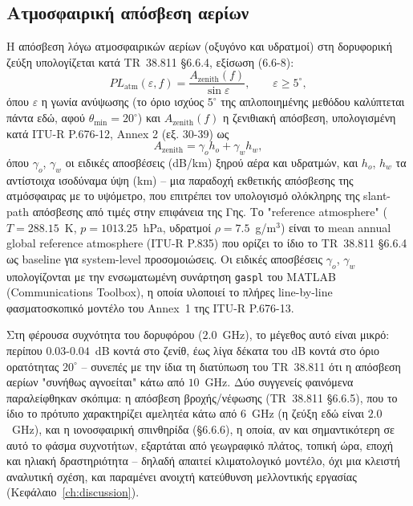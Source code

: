 \subsection{Ατμοσφαιρική απόσβεση αερίων}
\label{subsec:meth-gas-attenuation}

Η απόσβεση λόγω ατμοσφαιρικών αερίων (οξυγόνο και υδρατμοί) στη
δορυφορική ζεύξη υπολογίζεται κατά TR~38.811 §6.6.4, εξίσωση (6.6-8):
\begin{equation}
PL_{\text{atm}}(\varepsilon, f) = \frac{A_{\text{zenith}}(f)}{\sin\varepsilon},
\qquad \varepsilon \ge 5^\circ,
\label{eq:gas-atten}
\end{equation}
όπου $\varepsilon$ η γωνία ανύψωσης (το όριο ισχύος $5^\circ$ της
απλοποιημένης μεθόδου καλύπτεται πάντα εδώ, αφού $\theta_{\min} =
20^\circ$) και $A_{\text{zenith}}(f)$ η ζενιθιακή απόσβεση, υπολογισμένη
κατά ITU-R P.676-12, Annex 2 (εξ. 30-39) ως
\begin{equation}
A_{\text{zenith}} = \gamma_o h_o + \gamma_w h_w,
\label{eq:zenith-atten}
\end{equation}
όπου $\gamma_o$, $\gamma_w$ οι ειδικές αποσβέσεις (dB/km) ξηρού αέρα και
υδρατμών, και $h_o$, $h_w$ τα αντίστοιχα ισοδύναμα ύψη (km) -- μια
παραδοχή εκθετικής απόσβεσης της ατμόσφαιρας με το υψόμετρο, που
επιτρέπει τον υπολογισμό ολόκληρης της slant-path απόσβεσης από τιμές
στην επιφάνεια της Γης. Το "reference atmosphere" ($T = 288.15$~K, $p =
1013.25$~hPa, υδρατμοί $\rho = 7.5$~g/m$^3$) είναι το mean annual global
reference atmosphere (ITU-R P.835) που ορίζει το ίδιο το TR~38.811 §6.6.4
ως baseline για system-level προσομοιώσεις. Οι ειδικές αποσβέσεις
$\gamma_o$, $\gamma_w$ υπολογίζονται με την ενσωματωμένη συνάρτηση
\texttt{gaspl} του MATLAB (Communications Toolbox), η οποία υλοποιεί το
πλήρες line-by-line φασματοσκοπικό μοντέλο του Annex~1 της ITU-R
P.676-13.

Στη φέρουσα συχνότητα του δορυφόρου ($2.0$~GHz), το μέγεθος αυτό είναι
μικρό: περίπου $0.03$-$0.04$~dB κοντά στο ζενίθ, έως λίγα δέκατα του dB
κοντά στο όριο ορατότητας $20^\circ$ -- συνεπές με την ίδια τη διατύπωση
του TR~38.811 ότι η απόσβεση αερίων "συνήθως αγνοείται" κάτω από
$10$~GHz. Δύο συγγενείς φαινόμενα παραλείφθηκαν σκόπιμα: η απόσβεση
βροχής/νέφωσης (TR~38.811 §6.6.5), που το ίδιο το πρότυπο χαρακτηρίζει
αμελητέα κάτω από $6$~GHz (η ζεύξη εδώ είναι $2.0$~GHz), και η
ιονοσφαιρική σπινθηρίδα (§6.6.6), η οποία, αν και σημαντικότερη σε αυτό
το φάσμα συχνοτήτων, εξαρτάται από γεωγραφικό πλάτος, τοπική ώρα, εποχή
και ηλιακή δραστηριότητα -- δηλαδή απαιτεί κλιματολογικό μοντέλο, όχι μια
κλειστή αναλυτική σχέση, και παραμένει ανοιχτή κατεύθυνση μελλοντικής
εργασίας (Κεφάλαιο~\ref{ch:discussion}).


